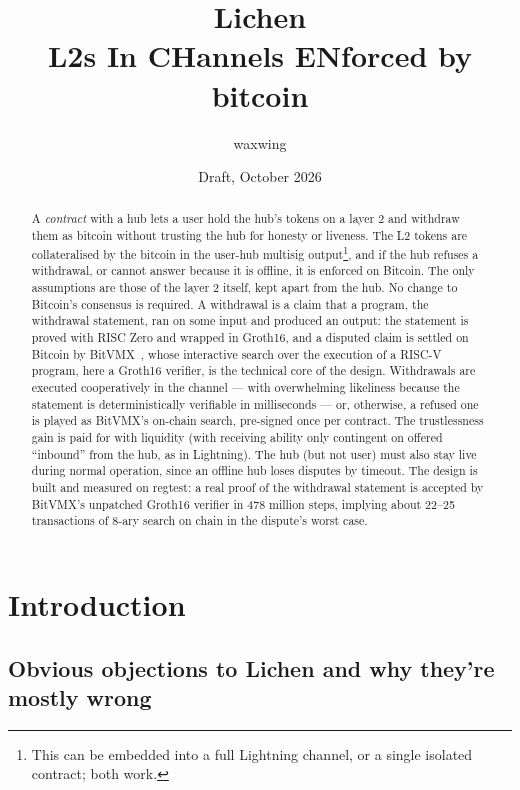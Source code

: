 \documentclass[11pt]{article}
\title{\textbf{Lichen}\\L2s In CHannels ENforced by bitcoin}
\author{waxwing}
\date{Draft, October 2026}
\begin{document}
\maketitle

\begin{abstract}
A \emph{contract} with a hub lets a user hold the hub's tokens on a layer 2 and
withdraw them as bitcoin without trusting the hub for honesty or liveness. The L2 tokens are collateralised by the bitcoin in the user-hub multisig output\footnote{This can be embedded into a full Lightning channel, or a single isolated contract; both work.}, and if the hub refuses a withdrawal, or cannot answer because it is offline, it is enforced on Bitcoin. The only assumptions are those of the layer 2 itself, kept apart from the hub. No change to Bitcoin's
consensus is required. A withdrawal is a claim that a program, the withdrawal statement, ran on some input and produced an output: the statement is proved with RISC Zero and wrapped in Groth16, and a disputed claim is settled on Bitcoin by BitVMX~\cite{bitvmx}, whose interactive search over the execution of a RISC-V program, here a Groth16 verifier, is the technical core of the design.  Withdrawals are executed cooperatively in the channel --- with overwhelming likeliness because the statement is deterministically verifiable in milliseconds --- or, otherwise, a refused one is played as BitVMX's on-chain search, pre-signed once per contract. The trustlessness gain is paid for with liquidity (with receiving ability only contingent on offered ``inbound'' from the hub, as in Lightning). The hub (but not user) must also stay live during normal operation, since an offline hub loses disputes by timeout. The design is built and measured on regtest: a real proof of the withdrawal statement is accepted by BitVMX's unpatched Groth16 verifier in 478 million steps, implying about 22--25 transactions of 8-ary search on chain in the dispute's worst case.
\end{abstract}

\tableofcontents

\section{Introduction}

\subsection{Obvious objections to Lichen and why they're mostly wrong}
\end{document}
